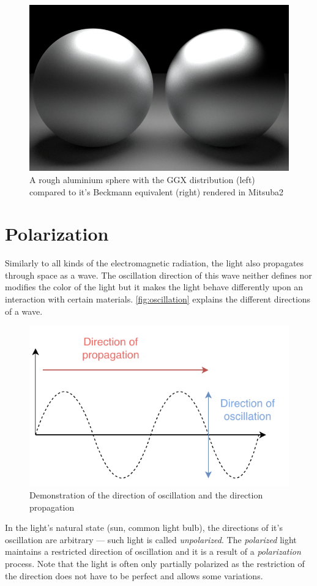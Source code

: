 \begin{figure}[h]
	\centering
	\includegraphics[width=.8\linewidth]{img/ggx_beckmann.png}
	\caption{A rough aluminium sphere with the GGX distribution (left) compared to it's Beckmann equivalent (right) rendered  in Mitsuba2}
	\label{fig:ggx_beckmann}
\end{figure}

\section{Polarization}
\label{sec:polarization}

Similarly to all kinds of the electromagnetic radiation, the light also propagates through space as a wave. The oscillation direction of this wave neither defines nor modifies the color of the light but it makes the light behave differently upon an interaction with certain materials. \autoref{fig:oscillation} explains the different directions of a wave.

\begin{figure}[h]
	\centering
	\includegraphics[width=.6\linewidth]{img/oscillation.pdf}
	\caption{Demonstration of the direction of oscillation and the direction propagation}
	\label{fig:oscillation}
\end{figure}

In the light's natural state (sun, common light bulb), the directions of it's oscillation are arbitrary --- such light is called \emph{unpolarized}. The \emph{polarized} light maintains a restricted direction of oscillation and it is a result of a \emph{polarization} process. Note that the light is often only partially polarized as the restriction of the direction does not have to be perfect and allows some variations.


